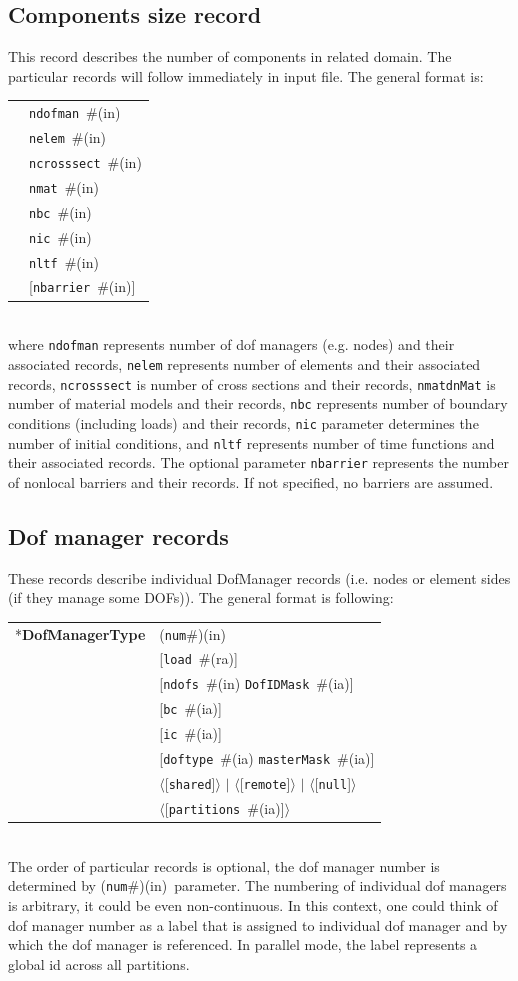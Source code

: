 \documentclass[a4paper]{article}
\makeatletter
\newcommand{\param}[1]{\texttt{#1}} %
\newcommand{\optional}[1]{[#1]} %
\newcommand{\field}[2]{\param{#1}~\#{\tiny(#2)}} %
\newcommand{\optField}[2]{\optional{\field{#1}{#2}}}
\newcommand{\optFieldnotype}[1]{[\param{#1}]}
\newcommand{\componentNum}{(\param{num}\#){\tiny(in)}} %
\newcommand{\entKeyword}[1]{*\textbf{#1}} %
\newcommand{\Pmode}[1]{{\sffamily #1}}
\newcommand{\oofemParallel}[1]{$\langle${#1}$\rangle$}
\newcommand{\PoptField}[2]{\oofemParallel{\optField{#1}{#2}}}
\newcommand{\PoptFieldnotype}[1]{\oofemParallel{\optFieldnotype{#1}}}
\newenvironment{record}[1][]{\begin{tabular}{|ll}}{\end{tabular}\\}
\newcommand{\recentry}[2]{{#1}&{#2}\\}
\newcounter{rcc}
\newenvironment{record}[1][\textwidth]{\setcounter{rcc}{0}\begin{tabular*}{#1}{|ll@{\extracolsep{\fill}}r}}{\end{tabular*}\\}
\newcommand{\recentry}[2]{\ifthenelse{\value{rcc}>0}{&$\backslash$ \\}{\setcounter{rcc}{1}}{#1}&{#2}}
\makeatother
\begin{document}
\subsection{Components size record}
\label{_ComponentsSizeRecord}
This record describes the number of components in related domain. The
particular records will follow immediately in input file. The general format is:\\
\begin{record}
  \recentry{}{\field{ndofman}{in}}
  \recentry{}{\field{nelem}{in}}
  \recentry{}{\field{ncrosssect}{in}}
  \recentry{}{\field{nmat}{in}}
  \recentry{}{\field{nbc}{in}}
  \recentry{}{\field{nic}{in}}
  \recentry{}{\field{nltf}{in}}
  \recentry{}{\optField{nbarrier}{in}}
\end{record}
where \param{ndofman} represents number of dof managers (e.g. nodes) and their associated records,
\param{nelem} represents number of elements and their associated records, \param{ncrosssect} is
number of cross sections and their records, \param{nmatdnMat}{} is number of material
models and their records, \param{nbc}{} represents number of boundary
conditions (including loads) and their
records, \param{nic} parameter determines the number of initial
conditions, and \param{nltf} represents number of time functions and
their associated records. The optional parameter \param{nbarrier}
represents the number of nonlocal barriers and their records. If not
specified, no barriers are assumed.

\subsection{Dof manager records}
\label{_NodeElementSideRecords}
These records describe individual DofManager records (i.e. nodes or element sides (if they manage some DOFs)). The general format is following:

\noindent
\begin{record}
  \recentry{\entKeyword{DofManagerType}}{\componentNum}
  \recentry{}{[\field{load}{ra}]}
  \recentry{}{[\field{ndofs}{in} \field{DofIDMask}{ia}]}
  \recentry{}{\optField{bc}{ia}}
  \recentry{}{\optField{ic}{ia}}
  \recentry{}{[\field{doftype}{ia} \field{masterMask}{ia}]}
  \recentry{}{\PoptFieldnotype{shared} $|$ \PoptFieldnotype{remote} $|$ \PoptFieldnotype{null}}
  \recentry{}{\PoptField{partitions}{ia}}
\end{record}
The order of particular records is optional, the dof manager number is determined by \componentNum\ parameter.
The numbering of individual dof managers is arbitrary, it could be even non-continuous. In this context, one could think of dof manager number as a label that is assigned to individual dof manager and by which the dof manager is referenced.
\Pmode{In parallel mode, the label represents a global id across all partitions.}
\end{document}
